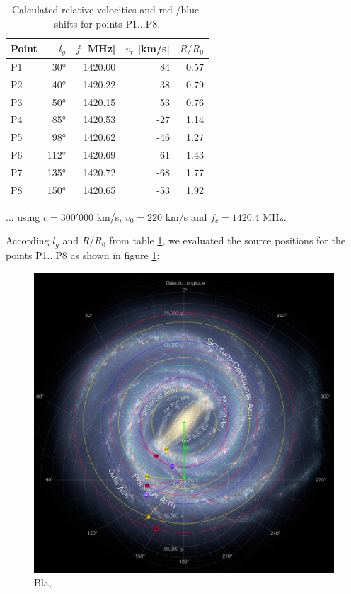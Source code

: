\begin{table}[H]
\centering \footnotesize
\begin{tabular}{l r  r  r  r }
    \toprule
    Point & $l_g$ & $f$ [MHz] & $v_r$ [km/s] & $R/R_0$\\
    \midrule
    P1    &  30°  & 1420.00   &  84          & 0.57 \\
    P2    &  40°  & 1420.22   &  38          & 0.79 \\
    P3    &  50°  & 1420.15   &  53          & 0.76 \\
    P4    &  85°  & 1420.53   & -27          & 1.14 \\
    P5    &  98°  & 1420.62   & -46          & 1.27 \\
    P6    & 112°  & 1420.69   & -61          & 1.43 \\
    P7    & 135°  & 1420.72   & -68          & 1.77 \\
    P8    & 150°  & 1420.65   & -53          & 1.92 \\
    \bottomrule
\end{tabular}
\caption{Calculated relative velocities and red-/blue-shifts for points P1...P8.}
\label{tab:hot_spots}
\end{table}

... using $c=300'000$ km/s, $v_0 = 220$ km/s and $f_c=1420.4$ MHz.

\pagebreak

According $l_g$ and $R/R_0$ from table \ref{tab:hot_spots}, we evaluated the source positions for the points P1...P8 as shown in figure \ref{fig:mw_roi_spots}:

\begin{figure}[H]
    \centering
    \includegraphics[width=\textwidth]{assets/MW_ROI_spots.png}
    \caption{Bla, \cite{staff_astrophysicists_2016}}
    \label{fig:mw_roi_spots}
\end{figure}

